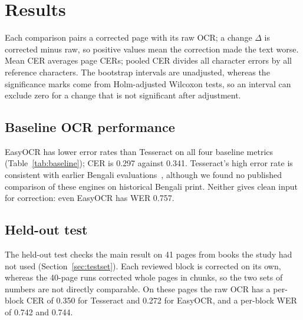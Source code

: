 \documentclass[conference]{IEEEtran}
\begin{document}
\section{Results}
\label{sec:results}

Each comparison pairs a corrected page with its raw OCR; a change $\Delta$ is corrected minus raw, so positive values mean the correction made the text worse. Mean CER averages page CERs; pooled CER divides all character errors by all reference characters. The bootstrap intervals are unadjusted, whereas the significance marks come from Holm-adjusted Wilcoxon tests, so an interval can exclude zero for a change that is not significant after adjustment.

\subsection{Baseline OCR performance}
EasyOCR has lower error rates than Tesseract on all four baseline metrics (Table~\ref{tab:baseline}); CER is 0.297 against 0.341. Tesseract's high error rate is consistent with earlier Bengali evaluations~\cite{rabby2024enhancement}, although we found no published comparison of these engines on historical Bengali print. Neither gives clean input for correction: even EasyOCR has WER 0.757.



\subsection{Held-out test}
\label{sec:heldout}
The held-out test checks the main result on 41 pages from books the study had not used (Section~\ref{sec:testset}). Each reviewed block is corrected on its own, whereas the 40-page runs corrected whole pages in chunks, so the two sets of numbers are not directly comparable. On these pages the raw OCR has a per-block CER of 0.350 for Tesseract and 0.272 for EasyOCR, and a per-block WER of 0.742 and 0.744.
\end{document}
